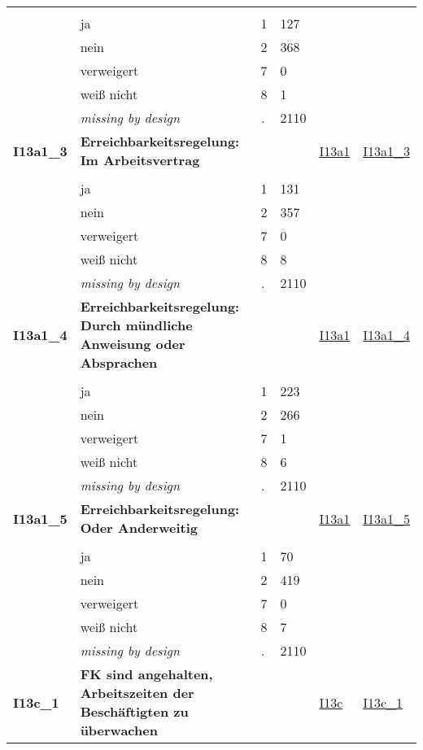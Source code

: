 \begin{longtable}{| L{2.45cm} | L{6cm} | C{1.5cm} | R{1cm} | C{2.25cm} | C{2.25cm} |}
   &  &  &  &  &  \\ 
   & ja & 1 & 127 &  &  \\ 
   & nein & 2 & 368 &  &  \\ 
   & verweigert & 7 & 0 &  &  \\ 
   & weiß nicht & 8 & 1 &  &  \\ 
   & \textit{missing by design} & \textit{.} & 2110 &  &  \\ 
   \midrule
\textbf{I13a1\_3}\label{var:I13a1:3} & \textbf{Erreichbarkeitsregelung: Im Arbeitsvertrag} &  &  & \hyperref[I13a1]{I13a1} & \hyperref[var:suf:I13a1:3]{I13a1\_3} \\ 
   &  &  &  &  &  \\ 
   & ja & 1 & 131 &  &  \\ 
   & nein & 2 & 357 &  &  \\ 
   & verweigert & 7 & 0 &  &  \\ 
   & weiß nicht & 8 & 8 &  &  \\ 
   & \textit{missing by design} & \textit{.} & 2110 &  &  \\ 
   \midrule
\textbf{I13a1\_4}\label{var:I13a1:4} & \textbf{Erreichbarkeitsregelung: Durch mündliche Anweisung oder Absprachen} &  &  & \hyperref[I13a1]{I13a1} & \hyperref[var:suf:I13a1:4]{I13a1\_4} \\ 
   &  &  &  &  &  \\ 
   & ja & 1 & 223 &  &  \\ 
   & nein & 2 & 266 &  &  \\ 
   & verweigert & 7 & 1 &  &  \\ 
   & weiß nicht & 8 & 6 &  &  \\ 
   & \textit{missing by design} & \textit{.} & 2110 &  &  \\ 
   \midrule
\textbf{I13a1\_5}\label{var:I13a1:5} & \textbf{Erreichbarkeitsregelung: Oder Anderweitig} &  &  & \hyperref[I13a1]{I13a1} & \hyperref[var:suf:I13a1:5]{I13a1\_5} \\ 
   &  &  &  &  &  \\ 
   & ja & 1 & 70 &  &  \\ 
   & nein & 2 & 419 &  &  \\ 
   & verweigert & 7 & 0 &  &  \\ 
   & weiß nicht & 8 & 7 &  &  \\ 
   & \textit{missing by design} & \textit{.} & 2110 &  &  \\ 
   \midrule
\textbf{I13c\_1}\label{var:I13c:1} & \textbf{FK sind angehalten, Arbeitszeiten der Beschäftigten zu überwachen} &  &  & \hyperref[I13c]{I13c} & \hyperref[var:suf:I13c:1]{I13c\_1} \\ 

\end{longtable}
